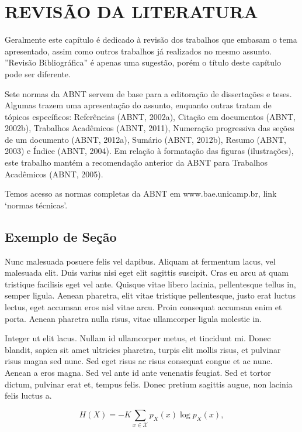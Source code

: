 \chapter{REVISÃO DA LITERATURA}
\label{cap:cap01}

Geralmente este capítulo é dedicado à revisão dos trabalhos que embasam o tema apresentado, assim como outros trabalhos já realizados no mesmo assunto. ”Revisão Bibliográfica” é apenas uma sugestão, porém o título deste capítulo pode ser diferente. 

Sete normas da ABNT servem de base para a editoração de dissertações e teses. Algumas trazem uma apresentação do assunto, enquanto outras tratam de tópicos específicos: Referências (ABNT, 2002a), Citação em documentos (ABNT, 2002b), Trabalhos Acadêmicos (ABNT, 2011), Numeração progressiva das seções de um documento (ABNT, 2012a), Sumário (ABNT, 2012b), Resumo (ABNT, 2003) e Índice (ABNT, 2004). Em relação à formatação das figuras (ilustrações), este trabalho mantém a recomendação anterior da ABNT para Trabalhos Acadêmicos (ABNT, 2005). 

Temos acesso as normas completas da ABNT em  www.bae.unicamp.br, link ‘normas técnicas’.


\section{Exemplo de Se\c{c}\~{a}o}
\label{sec:sec01}

Nunc malesuada posuere felis vel dapibus. Aliquam at fermentum lacus, vel malesuada elit. Duis varius nisi eget elit sagittis suscipit. Cras eu arcu at quam tristique facilisis eget vel ante. Quisque vitae libero lacinia, pellentesque tellus in, semper ligula. Aenean pharetra, elit vitae tristique pellentesque, justo erat luctus lectus, eget accumsan eros nisl vitae arcu. Proin consequat accumsan enim et porta. Aenean pharetra nulla risus, vitae ullamcorper ligula molestie in.

Integer ut elit lacus. Nullam id ullamcorper metus, et tincidunt mi. Donec blandit, sapien sit amet ultricies pharetra, turpis elit mollis risus, et pulvinar risus magna sed nunc. Sed eget risus ac risus consequat congue et ac nunc. Aenean a eros magna. Sed vel ante id ante venenatis feugiat. Sed et tortor dictum, pulvinar erat et, tempus felis. Donec pretium sagittis augue, non lacinia felis luctus a.

\begin{equation}
H(X) =-K\sum_{x\in\mathcal{X}} p_X(x)\log p_X(x),
\label{eq:shannonEntropy1}
\end{equation}

